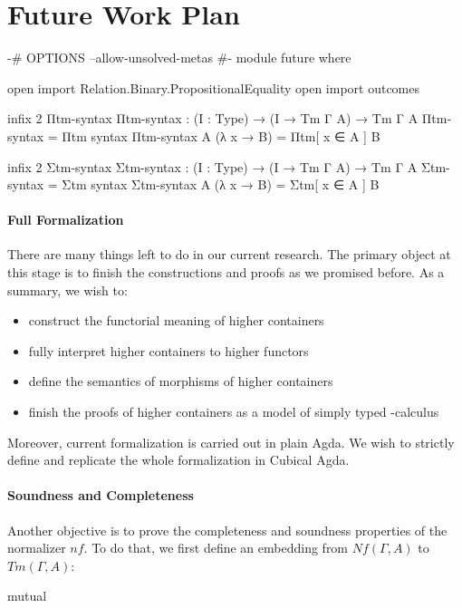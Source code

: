 \chapter{Future Work Plan}

\begin{code}[hide]
{-# OPTIONS --allow-unsolved-metas #-}
module future where

open import Relation.Binary.PropositionalEquality
open import outcomes

infix 2 Πtm-syntax
Πtm-syntax : (I : Type) → (I → Tm Γ A) → Tm Γ A
Πtm-syntax = Πtm
syntax Πtm-syntax A (λ x → B) = Πtm[ x ∈ A ] B

infix 2 Σtm-syntax
Σtm-syntax : (I : Type) → (I → Tm Γ A) → Tm Γ A
Σtm-syntax = Σtm
syntax Σtm-syntax A (λ x → B) = Σtm[ x ∈ A ] B
\end{code}

\subsubsection*{Full Formalization}

There are many things left to do in our current research. The primary object at this stage is to finish the constructions and proofs as we promised before. As a summary, we wish to:

\begin{itemize}
  \item{construct the functorial meaning of higher containers}
  \item{fully interpret higher containers to higher functors}
  \item{define the semantics of morphisms of higher containers}
  \item{finish the proofs of higher containers as a model of simply typed \lambda-calculus}
\end{itemize}

Moreover, current formalization is carried out in plain Agda. We wish to strictly define and replicate the whole formalization in Cubical Agda.

\subsubsection*{Soundness and Completeness}

Another objective is to prove the completeness and soundness properties of the normalizer $nf$. To do that, we first define an embedding from $Nf(\Gamma,A)$ to $Tm(\Gamma,A)$:

\begin{code}[hide]
mutual
\end{code}

